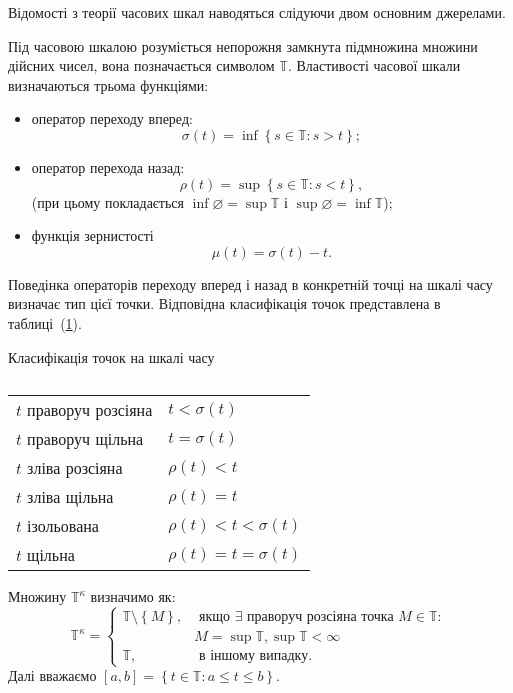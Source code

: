 Відомості з теорії часових шкал наводяться слідуючи двом основним
джерелами\cite{Bohner,BohnerAdv}.

\begin{definition}
Під часовою шкалою розуміється непорожня замкнута підмножина множини
дійсних чисел, вона позначається символом $\mathbb{T}$.
Властивості часової шкали визначаються трьома функціями:	
\begin{itemize}
		\item[1)] оператор переходу вперед:
		\[
		\sigma(t) = \inf\left\{s \in \mathbb{T}: s > t\right\};
		\]
		\item[2)] оператор перехода назад:
		\[
		\rho(t) = \sup\left\{s \in \mathbb{T}: s < t\right\},
		\]
		(при цьому покладається  $\inf\varnothing = \sup{\mathbb{T}}$ і $\sup\varnothing = \inf{\mathbb{T}}$);
		\item[3)]функція зернистості
		$$\mu(t) = \sigma(t) - t.$$
	\end{itemize}
\end{definition}
Поведінка операторів переходу вперед і назад в конкретній точці на шкалі часу
визначає тип цієї точки. Відповідна класифікація точок представлена в
таблиці~(\ref{tab:pointclass}).
\begin{table}[h]

	\centering		
		\caption{}	Класифікація точок на шкалі часу\\
		\begin{tabular}{|l|l|}
			\hline
			$t$ праворуч розсіяна & $t < \sigma(t)$ \\
			$t$ праворуч щільна    & $t = \sigma(t)$ \\
			$t$ зліва розсіяна  & $ \rho(t) < t $ \\
			$t$ зліва щільна     & $ \rho(t) = t $ \\
			$t$ ізольована      & $\rho(t) < t < \sigma(t)$ \\
			$t$ щільна          & $\rho(t) = t = \sigma(t)$ \\
			\hline
		\end{tabular}
	
	\label{tab:pointclass}
\end{table}

\begin{definition}
	 Множину $\mathbb{T}^\kappa$ визначимо як:
	 \[
	 \mathbb{T}^\kappa =
	 \begin{cases}
	 \mathbb{T}\setminus \left\{M\right\}, & \text{ якщо }
	 \exists \text{ праворуч розсіяна точка } M \in \mathbb{T}:\\
	 & M = \sup\mathbb{T}, \sup\mathbb{T}<\infty  \\
	 \mathbb{T} , & \text{ в іншому випадку}.
	 \end{cases}
	 \]
	 Далі вважаємо $\left[a, b\right] =
	 \left\{t \in \mathbb{T} : a \leqslant t \leqslant b\right\}$.
\end{definition}

